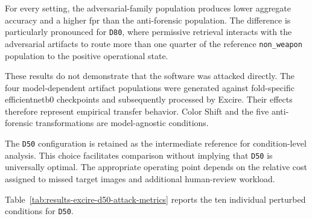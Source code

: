 For every setting, the adversarial-family population produces lower aggregate
accuracy and a higher \gls{fpr} than the anti-forensic population. The
difference is particularly pronounced for \texttt{D80}, where permissive
retrieval interacts with the adversarial artifacts to route more than one
quarter of the reference \texttt{non\_weapon} population to the positive
operational state.

These results do not demonstrate that the software was attacked directly. The
four model-dependent artifact populations were generated against fold-specific
\gls{efficientnetb0} checkpoints and subsequently processed by Excire. Their effects
therefore represent empirical transfer behavior. Color Shift and the five
anti-forensic transformations are model-agnostic conditions.

The \texttt{D50} configuration is retained as the intermediate reference for
condition-level analysis. This choice facilitates comparison without implying
that \texttt{D50} is universally optimal. The appropriate operating point
depends on the relative cost assigned to missed target images and additional
human-review workload.

Table~\ref{tab:results-excire-d50-attack-metrics} reports the ten individual
perturbed conditions for \texttt{D50}.

